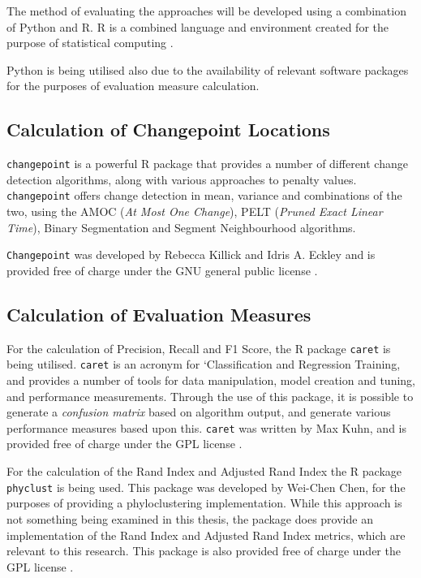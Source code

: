 \documentclass[../main.tex]{subfiles}
\begin{document}
The method of evaluating the approaches will be developed using a combination of Python and \textsf{R}. \textsf{R} is a combined language and environment created for the purpose of statistical computing \cite{RCoreTeam2017}.

Python is being utilised also due to the availability of relevant software packages for the purposes of evaluation measure calculation.

\subsection{Calculation of Changepoint Locations}

\texttt{changepoint} is a powerful R package that provides a number of different change detection algorithms, along with various approaches to penalty values. \texttt{changepoint} offers change detection in mean, variance and combinations of the two, using the AMOC (\emph{At Most One Change}), PELT (\emph{Pruned Exact Linear Time}), Binary Segmentation and Segment Neighbourhood algorithms.

\texttt{Changepoint} was developed by Rebecca Killick and Idris A. Eckley and is provided free of charge under the GNU general public license \cite{Killick2014}.

\subsection{Calculation of Evaluation Measures}

For the calculation of Precision, Recall and F1 Score, the \textsf{R} package \texttt{caret} is being utilised. \texttt{caret} is an acronym for `Classification and Regression Training, and provides a number of tools for data manipulation, model creation and tuning, and performance measurements. Through the use of this package, it is possible to generate a \emph{confusion matrix} based on algorithm output, and generate various performance measures based upon this. \texttt{caret} was written by Max Kuhn, and is provided free of charge under the GPL license \cite{FromJedWing2017}.

For the calculation of the Rand Index and Adjusted Rand Index the \textsf{R} package \texttt{phyclust} is being used. This package was developed by Wei-Chen Chen, for the purposes of providing a phyloclustering implementation. While this approach is not something being examined in this thesis, the package does provide an implementation of the Rand Index and Adjusted Rand Index metrics, which are relevant to this research. This package is also provided free of charge under the GPL license \cite{Chen2011}.
\end{document}
